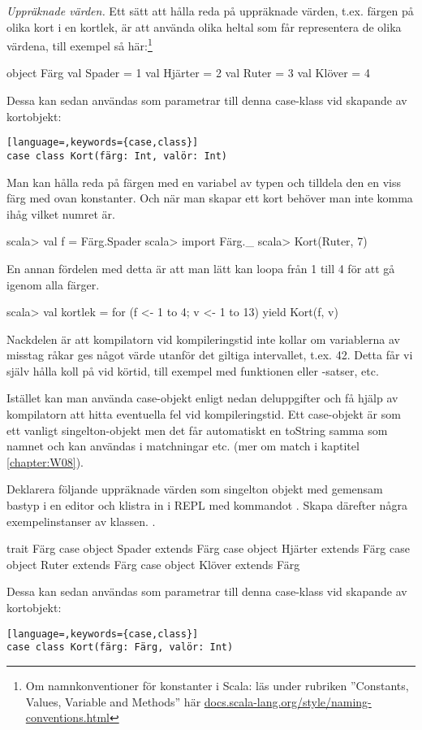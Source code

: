 \Task \emph{Uppräknade värden.} Ett sätt att hålla reda på uppräknade värden, t.ex. färgen på olika kort i en kortlek, är att använda olika heltal som får representera de olika värdena, till exempel så här:\footnote{Om namnkonventioner för konstanter i Scala: läs under rubriken ''Constants, Values, Variable and Methods'' här \href{http://docs.scala-lang.org/style/naming-conventions.html}{docs.scala-lang.org/style/naming-conventions.html}} 
\begin{Code}
object Färg {
  val Spader = 1
  val Hjärter = 2
  val Ruter = 3
  val Klöver = 4
}
\end{Code}
Dessa kan sedan användas som parametrar till denna case-klass vid skapande av kortobjekt:
\begin{lstlisting}[language=,keywords={case,class}]
case class Kort(färg: Int, valör: Int)
\end{lstlisting}
Man kan hålla reda på färgen med en variabel av typen  och tilldela den en viss färg med ovan konstanter. Och när man skapar ett kort behöver man inte komma ihåg vilket numret är.
\begin{REPL}
scala> val f = Färg.Spader
scala> import Färg._
scala> Kort(Ruter, 7)
\end{REPL}
En annan fördelen med detta är att man lätt kan loopa från 1 till 4 för att gå igenom alla färger. 
\begin{REPL}
scala> val kortlek = for (f <- 1 to 4; v <- 1 to 13) yield Kort(f, v)
\end{REPL}
Nackdelen är att kompilatorn vid kompileringstid inte kollar om variablerna av misstag råkar ges något värde utanför det giltiga intervallet, t.ex. 42. Detta får vi själv hålla koll på vid körtid, till exempel med funktionen  eller -satser, etc.

Istället kan man använda case-objekt enligt nedan deluppgifter och få hjälp av kompilatorn att hitta eventuella fel vid kompileringstid.  Ett case-objekt är som ett vanligt singelton-objekt men det får automatiskt en toString samma som namnet och kan användas i matchningar etc. (mer om match i kaptitel \ref{chapter:W08}). 

\Subtask Deklarera följande uppräknade värden som singelton objekt med gemensam bastyp i en editor och klistra in i REPL med kommandot . Skapa därefter några exempelinstanser av klassen. .
\begin{Code}
trait Färg
case object Spader extends Färg
case object Hjärter extends Färg
case object Ruter extends Färg
case object Klöver extends Färg
\end{Code}
Dessa kan sedan användas som parametrar till denna case-klass vid skapande av kortobjekt:
\begin{lstlisting}[language=,keywords={case,class}]
case class Kort(färg: Färg, valör: Int)
\end{lstlisting}

